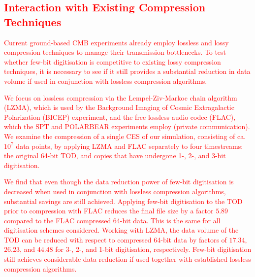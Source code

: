 \documentclass[apj]{emulateapj}
\newcommand{\changed}[1]{\textcolor{Red}{#1}}
\begin{document}


\subsection{\changed{Interaction with Existing Compression Techniques}}

\changed{Current ground-based CMB experiments already employ 
 lossless and lossy compression techniques to manage their transmission bottlenecks. To test whether few-bit digitisation is competitive to existing lossy compression techniques, it is necessary to see if it still provides a substantial reduction in data volume if used in conjunction with lossless compression algorithms.}

\changed{We focus on lossless compression via the Lempel-Ziv-Markoc chain algorithm (LZMA), which is used by the Background Imaging of Cosmic Extragalactic Polarization (BICEP) experiment, and the free lossless audio codec (FLAC), which the SPT and POLARBEAR experiments employ (private communication). We examine the compression of a single CES of our simulation, consisting of ca. $10^7$ data points, by applying LZMA and FLAC separately to four timestreams: the original 64-bit TOD, and copies that have undergone 1-, 2-, and 3-bit digitisation.}

\changed{We find that even though the data reduction power of few-bit digitisation is decreased when used in conjunction with lossless compression algorithms, substantial savings are still achieved. Applying few-bit digitisation to the TOD prior to compression with FLAC reduces the final file size by a factor $5.89$ compared to the FLAC compressed 64-bit data. This is the same for all digitisation schemes considered. Working with LZMA, the data volume of the TOD can be reduced with respect to compressed 64-bit data by factors of $17.34$, $26.23$, and $44.48$ for 3-, 2-, and 1-bit digitisation, respectively. Few-bit digitisation still achieves considerable data reduction if used together with established lossless compression algorithms.}
\end{document}
